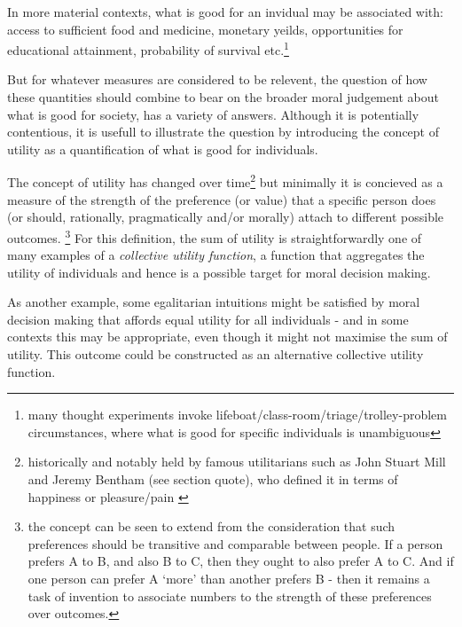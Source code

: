 In more material contexts, what is good for an invidual may be associated with: access to sufficient food and medicine, monetary yeilds, opportunities for educational attainment, probability of survival etc.\footnote{many thought experiments invoke lifeboat/class-room/triage/trolley-problem circumstances, where what is good for specific individuals is unambiguous}

But for whatever measures are considered to be relevent, the question of how these quantities should combine to bear on the broader moral judgement about what is good for society, has a variety of answers.
Although it is potentially contentious, it is usefull to illustrate the question by introducing the concept of utility as a quantification of what is good for individuals.

The concept of utility has changed over time\footnote{historically and notably held by famous utilitarians such as John Stuart Mill\cite{MillGutenberg} and Jeremy Bentham (see section quote), who defined it in terms of happiness or pleasure/pain \cite{bentham1823introduction}}
but minimally it is concieved as a measure of the strength of the preference (or value) that a specific person does (or should, rationally, pragmatically and/or morally) attach to different possible outcomes.%
\footnote{the concept can be seen to extend from the consideration that such preferences should be transitive and comparable between people. If a person prefers A to B, and also B to C, then they ought to also prefer A to C. And if one person can prefer A `more' than another prefers B - then it remains a task of invention to associate numbers to the strength of these preferences over outcomes.}
For this definition, the sum of utility is straightforwardly one of many examples of a \textit{collective utility function}, a function that aggregates the utility of individuals and hence is a possible target for moral decision making.\cite{TheoriesofValueAggregation}

As another example, some egalitarian intuitions might be satisfied by moral decision making that affords equal utility for all individuals - and in some contexts this may be appropriate, even though it might not maximise the sum of utility. This outcome could be constructed as an alternative collective utility function.

